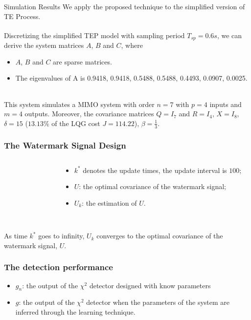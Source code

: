 \documentclass[10pt]{beamer}
\newcommand{\tikzdir}[1]{#1.tikz}
\newcommand{\inputtikz}[1]{}}
\begin{document}
  \begin{frame}{Simulation Results}
    We apply the proposed technique to the simplified version of TE Process. \\~\\

    Discretizing the simplified TEP model with sampling period $T_{sp} = 0.6s$, we can derive the system matrices $A$, $B$ and $C$, where  
    \begin{itemize}
    \item $A$, $B$ and $C$ are sparse matrices.
    \item The eigenvalues of A is 0.9418,  0.9418, 0.5488, 0.5488, 0.4493, 0.0907, 0.0025. 
    \end{itemize}
    ~\\
    This system simulates a MIMO system with order $n = 7$ with  $p = 4$ inputs and $m = 4$ outputs. Moreover, the covariance matrices $Q = I_{7}$ and $ R = I_{4}$, $X = I_{8}$,  $\delta = 15$ ($13.13\%$ of the LQG cost $J = 114.22$), $\beta = \frac{1}{3}$.
  \end{frame}

  \begin{frame}
    \frametitle{The Watermark Signal Design}
    \begin{columns}
      \begin{column}{0.6\textwidth}
        \begin{figure}[h!]
          \inputtikz{errU1_te}
        \end{figure}
      \end{column}
      \begin{column}{0.4\textwidth}
        \begin{itemize}
        \item  $k^*$ denotes the update times, the update interval is $100$;
        \item $U$: the optimal covariance of the watermark signal;
        \item $U_k$: the estimation of $U$.
        \end{itemize}
      \end{column}
    \end{columns}
    ~\\
    As time $k^*$ goes to infinity, $U_k$ converges to the optimal covariance of the watermark signal, $U$.
  \end{frame}

  \begin{frame}
    \frametitle{The detection performance}
    \begin{itemize}
    \item $g_n$: the output of the $\chi^2$ detector designed with know parameters
    \item $g$: the output of the $\chi^2$ detector when the parameters of the system are inferred through the learning technique. 
    \end{itemize}
    \begin{figure}[h!]
      \centering
      \inputtikz{gng_te}
    \end{figure}
  \end{frame}
\end{document}
